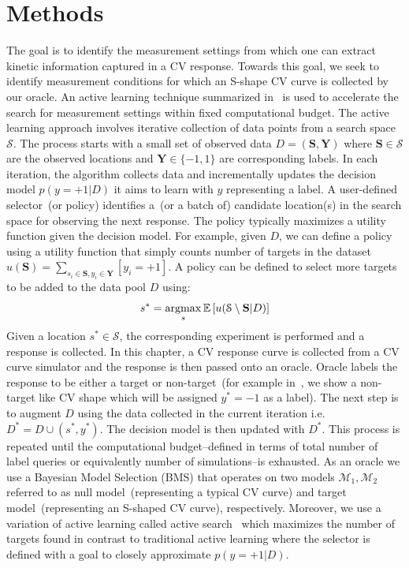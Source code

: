 \section{Methods}
The goal is to identify the measurement settings from which one can extract kinetic information captured in a CV response.
Towards this goal, we seek to identify measurement conditions for which an S-shape CV curve is collected by our oracle. 
An active learning technique summarized in~ is used to accelerate the search for measurement settings within fixed computational budget. 
The active learning approach involves iterative collection of data points from a search space \(\mathcal{S}\).
The process starts with a small set of observed data \(D=(\textbf{S},\textbf{Y})\) where \(\textbf{S}\in\mathcal{S}\) are the observed locations and \(\textbf{Y}\in\{-1,1\}\) are corresponding labels. 
In each iteration, the algorithm collects data and incrementally updates the decision model \(p(y=+1|D)\) it aims to learn with \(y\) representing a label.
A user-defined selector~(or policy) identifies a~(or a batch of) candidate location(s) in the search space for observing the next response.
The policy typically maximizes a utility function given the decision model. 
For example, given \(D\), we can define a policy using a utility function that simply counts number of targets in the dataset \(u(\textbf{S})=\sum\limits_{s_i\in \textbf{S}, y_i \in \textbf{Y}} [y_i=+1]\). 
A policy can be defined to select more targets to be added to the data pool \(D\) using: 
\begin{equation}
    s^* = \operatorname*{argmax}_s \mathbb{E}\left[ u(\mathcal{S} \setminus \textbf{S} | D )\right] 
    \label{eq:policy}
\end{equation}
Given a location \(s^* \in\mathcal{S}\), the corresponding experiment is performed and a response is collected. 
In this chapter, a CV response curve is collected from a CV curve simulator and the response is then passed onto an oracle. 
Oracle labels the response to be either a target or non-target~(for example in~, we show a non-target like CV shape which will be  assigned \(y^*=-1\) as a label). 
The next step is to augment \(D\) using the data collected in the current iteration i.e. \(D^* = D\cup (s^*,y^*) \). 
The decision model is then updated with \(D^*\). 
This process is repeated until the computational budget--defined in terms of total number of label queries or equivalently number of simulations--is exhausted.
As an oracle we use a Bayesian Model Selection (BMS) that operates on two models \(\mathcal{M}_1, \mathcal{M}_2\) referred to as null model~(representing a typical CV curve) and target model~(representing an S-shaped CV curve), respectively.
Moreover, we use a variation of active learning called active search~\cite{garnett2012bayesian} which maximizes the number of targets found in contrast to traditional active learning where the selector is defined with a goal to closely approximate \(p(y=+1\vert D )\).


